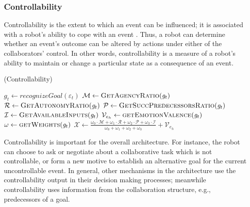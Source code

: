 \subsubsection{Controllability}
\label{sec:controllability}

Controllability is the extent to which an event can be influenced; it is
associated with a robot's ability to cope with an event
\cite{gratch:domain-independent}. Thus, a robot can determine whether an event's
outcome can be altered by actions under either of the collaborators' control. In
other words, controllability is a measure of a robot's ability to maintain or
change a particular state as a consequence of an event.

\begin{algorithm}
	\caption{(Controllability)}
	\label{alg:controllability}
	\begin{algorithmic}[1]
 			\State $\mathit{g}_{t} \gets \textit{recognizeGoal}{(\varepsilon_t)}$
  			\Statex
			\State $\mathcal{M} \gets \Call{GetAgencyRatio}{\mathit{g}_{t}}$ 
			\State $\mathcal{R} \gets \Call{GetAutonomyRatio}{\mathit{g}_{t}}$
 			\Statex
			\State $\mathcal{P} \gets \Call{GetSuccPredecessorsRatio}{\mathit{g}_{t}}$
			\State $\mathcal{I} \gets \Call{GetAvailableInputs}{\mathit{g}_{t}}$
  			\Statex
			\State $\mathcal{V}_{e_h} \gets \Call{getEmotionValence}{\mathit{g}_{t}}$ 
			\State $\omega \gets \Call{getWeights}{\mathit{g}_{t}}$
			\Statex
			\State $\mathcal{X} \gets
			\frac{\omega_{0}\cdot \mathcal{M} + \omega_{1}\cdot \mathcal{R} +
			\omega_{2}\cdot \mathcal{P} + \omega_{3}\cdot \mathcal{I}}{\omega_{0} +
			\omega_{1} + \omega_{2} + \omega_{3}} + \mathcal{V}_{e_h}$
  			\Statex
 			\Statex
 				\State {}
			\Else
 				\State {}
			\EndIf
		\EndFunction
	\end{algorithmic}
\end{algorithm}

Controllability is important for the overall architecture. For instance, the
robot can choose to ask or negotiate about a collaborative task which is not
controllable, or form a new motive to establish an alternative goal for the
current uncontrollable event. In general, other mechanisms in the architecture
use the controllability output in their decision making processes; meanwhile
controllability uses information from the collaboration structure, e.g.,
predecessors of a goal.


